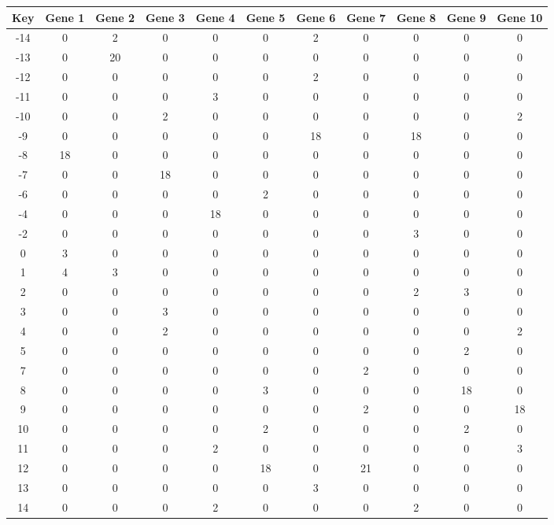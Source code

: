 \begin{tabular}{|c|c|c|c|c|c|c|c|c|c|c|}
\hline
Key & Gene 1 & Gene 2 & Gene 3 & Gene 4 & Gene 5 & Gene 6 & Gene 7 & Gene 8 & Gene 9 & Gene 10 \\
\hline
-14 & 0 & 2 & 0 & 0 & 0 & 2 & 0 & 0 & 0 & 0 \\
-13 & 0 & 20 & 0 & 0 & 0 & 0 & 0 & 0 & 0 & 0 \\
-12 & 0 & 0 & 0 & 0 & 0 & 2 & 0 & 0 & 0 & 0 \\
-11 & 0 & 0 & 0 & 3 & 0 & 0 & 0 & 0 & 0 & 0 \\
-10 & 0 & 0 & 2 & 0 & 0 & 0 & 0 & 0 & 0 & 2 \\
-9 & 0 & 0 & 0 & 0 & 0 & 18 & 0 & 18 & 0 & 0 \\
-8 & 18 & 0 & 0 & 0 & 0 & 0 & 0 & 0 & 0 & 0 \\
-7 & 0 & 0 & 18 & 0 & 0 & 0 & 0 & 0 & 0 & 0 \\
-6 & 0 & 0 & 0 & 0 & 2 & 0 & 0 & 0 & 0 & 0 \\
-4 & 0 & 0 & 0 & 18 & 0 & 0 & 0 & 0 & 0 & 0 \\
-2 & 0 & 0 & 0 & 0 & 0 & 0 & 0 & 3 & 0 & 0 \\
0 & 3 & 0 & 0 & 0 & 0 & 0 & 0 & 0 & 0 & 0 \\
1 & 4 & 3 & 0 & 0 & 0 & 0 & 0 & 0 & 0 & 0 \\
2 & 0 & 0 & 0 & 0 & 0 & 0 & 0 & 2 & 3 & 0 \\
3 & 0 & 0 & 3 & 0 & 0 & 0 & 0 & 0 & 0 & 0 \\
4 & 0 & 0 & 2 & 0 & 0 & 0 & 0 & 0 & 0 & 2 \\
5 & 0 & 0 & 0 & 0 & 0 & 0 & 0 & 0 & 2 & 0 \\
7 & 0 & 0 & 0 & 0 & 0 & 0 & 2 & 0 & 0 & 0 \\
8 & 0 & 0 & 0 & 0 & 3 & 0 & 0 & 0 & 18 & 0 \\
9 & 0 & 0 & 0 & 0 & 0 & 0 & 2 & 0 & 0 & 18 \\
10 & 0 & 0 & 0 & 0 & 2 & 0 & 0 & 0 & 2 & 0 \\
11 & 0 & 0 & 0 & 2 & 0 & 0 & 0 & 0 & 0 & 3 \\
12 & 0 & 0 & 0 & 0 & 18 & 0 & 21 & 0 & 0 & 0 \\
13 & 0 & 0 & 0 & 0 & 0 & 3 & 0 & 0 & 0 & 0 \\
14 & 0 & 0 & 0 & 2 & 0 & 0 & 0 & 2 & 0 & 0 \\
\hline
\end{tabular}